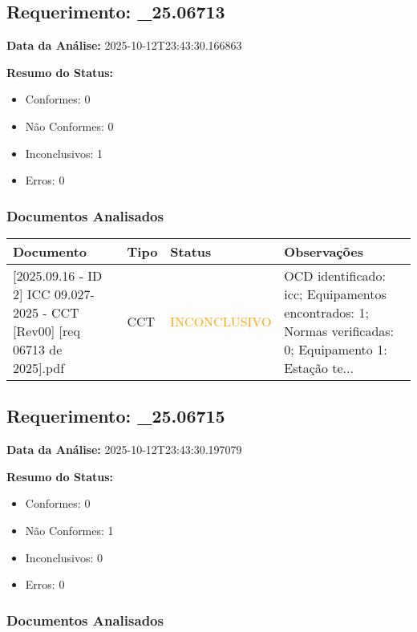 \documentclass[12pt,a4paper]{article}
\begin{document}
\subsection{Requerimento: \_25.06713}

\textbf{Data da Análise:} 2025-10-12T23:43:30.166863

\textbf{Resumo do Status:}
\begin{itemize}
    \item Conformes: 0
    \item Não Conformes: 0
    \item Inconclusivos: 1
    \item Erros: 0
\end{itemize}

\subsubsection{Documentos Analisados}

\begin{longtable}{|p{4cm}|p{2cm}|p{2cm}|p{6cm}|}
\hline
\textbf{Documento} & \textbf{Tipo} & \textbf{Status} & \textbf{Observações} \\
\hline
\endhead
[Certificado de Conformidade Técnica - CCT][2025.09.16 - ID 2] ICC 09.027-2025 - CCT [Rev00] [req 06713 de  2025].pdf & CCT & \textcolor{orange}{INCONCLUSIVO} & OCD identificado: icc; Equipamentos encontrados: 1; Normas verificadas: 0; Equipamento 1: Estação te... \\
\hline
\end{longtable}


\subsection{Requerimento: \_25.06715}

\textbf{Data da Análise:} 2025-10-12T23:43:30.197079

\textbf{Resumo do Status:}
\begin{itemize}
    \item Conformes: 0
    \item Não Conformes: 1
    \item Inconclusivos: 0
    \item Erros: 0
\end{itemize}

\subsubsection{Documentos Analisados}
\end{document}
